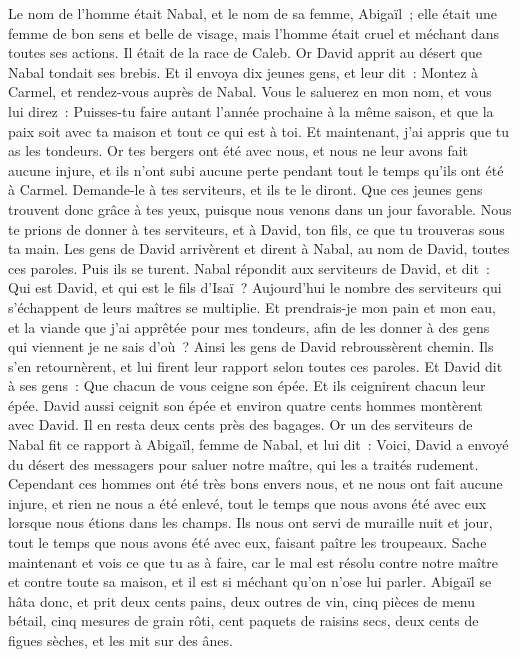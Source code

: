 \begin{multicols}{2}
Le nom de l'homme était Nabal, et le nom de sa femme, Abigaïl~; elle était une femme de bon sens et belle de visage, mais l'homme était cruel et méchant dans toutes ses actions. Il était de la race de Caleb.
Or David apprit au désert que Nabal tondait ses brebis.
Et il envoya dix jeunes gens, et leur dit~: Montez à Carmel, et rendez-vous auprès de Nabal. Vous le saluerez en mon nom,
et vous lui direz~: Puisses-tu faire autant l'année prochaine à la même saison, et que la paix soit avec ta maison et tout ce qui est à toi.
Et maintenant, j'ai appris que tu as les tondeurs. Or tes bergers ont été avec nous, et nous ne leur avons fait aucune injure, et ils n'ont subi aucune perte pendant tout le temps qu'ils ont été à Carmel.
Demande-le à tes serviteurs, et ils te le diront. Que ces jeunes gens trouvent donc grâce à tes yeux, puisque nous venons dans un jour favorable. Nous te prions de donner à tes serviteurs, et à David, ton fils, ce que tu trouveras sous ta main.
Les gens de David arrivèrent et dirent à Nabal, au nom de David, toutes ces paroles. Puis ils se turent.
Nabal répondit aux serviteurs de David, et dit~: Qui est David, et qui est le fils d'Isaï~? Aujourd'hui le nombre des serviteurs qui s'échappent de leurs maîtres se multiplie.
Et prendrais-je mon pain et mon eau, et la viande que j'ai apprêtée pour mes tondeurs, afin de les donner à des gens qui viennent je ne sais d'où~?
Ainsi les gens de David rebroussèrent chemin. Ils s'en retournèrent, et lui firent leur rapport selon toutes ces paroles.
Et David dit à ses gens~: Que chacun de vous ceigne son épée. Et ils ceignirent chacun leur épée. David aussi ceignit son épée et environ quatre cents hommes montèrent avec David. Il en resta deux cents près des bagages.
Or un des serviteurs de Nabal fit ce rapport à Abigaïl, femme de Nabal, et lui dit~: Voici, David a envoyé du désert des messagers pour saluer notre maître, qui les a traités rudement.
Cependant ces hommes ont été très bons envers nous, et ne nous ont fait aucune injure, et rien ne nous a été enlevé, tout le temps que nous avons été avec eux lorsque nous étions dans les champs.
Ils nous ont servi de muraille nuit et jour, tout le temps que nous avons été avec eux, faisant paître les troupeaux.
Sache maintenant et vois ce que tu as à faire, car le mal est résolu contre notre maître et contre toute sa maison, et il est si méchant qu'on n'ose lui parler.
Abigaïl se hâta donc, et prit deux cents pains, deux outres de vin, cinq pièces de menu bétail, cinq mesures de grain rôti, cent paquets de raisins secs, deux cents de figues sèches, et les mit sur des ânes.

\end{multicols}
